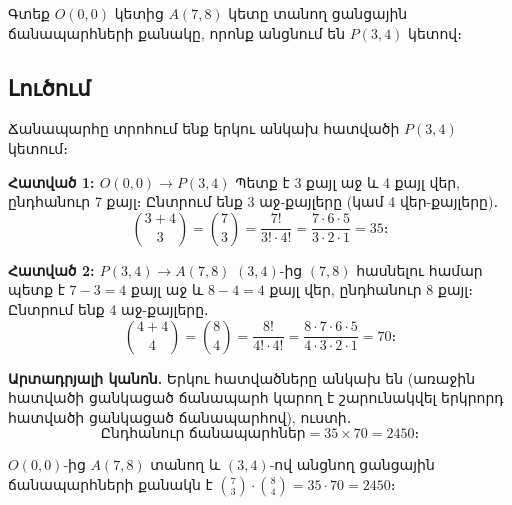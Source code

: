 \documentclass[12pt, a4paper]{article}
\begin{document}
\begin{theorybox}
\begin{center}
\end{center}
\end{theorybox}

\begin{problembox}
Գտեք $O(0,0)$ կետից $A(7,8)$ կետը տանող ցանցային ճանապարհների քանակը,
որոնք անցնում են $P(3,4)$ կետով։
\end{problembox}

\subsection*{Լուծում}

Ճանապարհը տրոհում ենք երկու անկախ հատվածի $P(3,4)$ կետում։

\textbf{Հատված 1: $O(0,0) \to P(3,4)$}\;
Պետք է 3 քայլ աջ և 4 քայլ վեր, ընդհանուր 7 քայլ։
Ընտրում ենք 3 աջ-քայլերը (կամ 4 վեր-քայլերը)․
\[
  \binom{3+4}{3} = \binom{7}{3}
  = \frac{7!}{3!\cdot 4!}
  = \frac{7 \cdot 6 \cdot 5}{3 \cdot 2 \cdot 1}
  = 35 \text{։}
\]

\textbf{Հատված 2: $P(3,4) \to A(7,8)$}\;
$(3,4)$-ից $(7,8)$ հասնելու համար պետք է $7-3=4$ քայլ աջ և $8-4=4$ քայլ վեր,
ընդհանուր 8 քայլ։ Ընտրում ենք 4 աջ-քայլերը․
\[
  \binom{4+4}{4} = \binom{8}{4}
  = \frac{8!}{4!\cdot 4!}
  = \frac{8 \cdot 7 \cdot 6 \cdot 5}{4 \cdot 3 \cdot 2 \cdot 1}
  = 70 \text{։}
\]

\textbf{Արտադրյալի կանոն.}\;
Երկու հատվածները անկախ են (առաջին հատվածի ցանկացած ճանապարհ կարող է
շարունակվել երկրորդ հատվածի ցանկացած ճանապարհով), ուստի․
\[
  \text{Ընդհանուր ճանապարհներ} = 35 \times 70 = 2450 \text{։}
\]

\begin{answerbox}
\centering
$O(0,0)$-ից $A(7,8)$ տանող և $(3,4)$-ով անցնող ցանցային ճանապարհների
քանակն է $\binom{7}{3} \cdot \binom{8}{4} = 35 \cdot 70 = \boxed{2450}$։
\end{answerbox}
\end{document}
